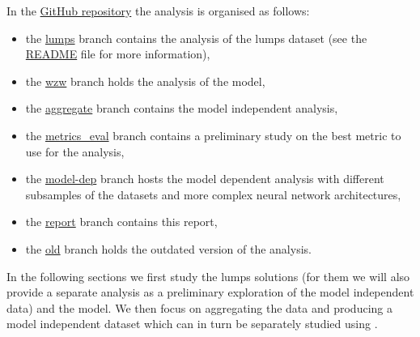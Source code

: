 In the \href{https://github.com/thesfinox/ml-sft-trunc}{GitHub repository} the analysis is organised as follows:
\begin{itemize}
  \item the \href{https://github.com/thesfinox/ml-sft-trunc}{lumps} branch contains the analysis of the lumps dataset (see the \href{https://github.com/thesfinox/ml-sft-trunc/blob/lumps/README.md}{README} file for more information),

  \item the \href{https://github.com/thesfinox/ml-sft-trunc/tree/wzw}{wzw} branch holds the analysis of the \wzw model,

  \item the \href{https://github.com/thesfinox/ml-sft-trunc/tree/aggregate}{aggregate} branch contains the model independent analysis,

  \item the \href{https://github.com/thesfinox/ml-sft-trunc/tree/metrics_eval}{metrics\_eval} branch contains a preliminary study on the best metric to use for the analysis,

  \item the \href{https://github.com/thesfinox/ml-sft-trunc/tree/model-dep}{model-dep} branch hosts the model dependent analysis with different subsamples of the datasets and more complex neural network architectures,

  \item the \href{https://github.com/thesfinox/ml-sft-trunc/tree/report}{report} branch contains this report,

  \item the \href{https://github.com/thesfinox/ml-sft-trunc/tree/old}{old} branch holds the outdated version of the analysis.
\end{itemize}

In the following sections we first study the lumps solutions (for them we will also provide a separate \ml analysis as a preliminary exploration of the model independent data) and the \wzw model.
We then focus on aggregating the data and producing a model independent dataset which can in turn be separately studied using \ml.

